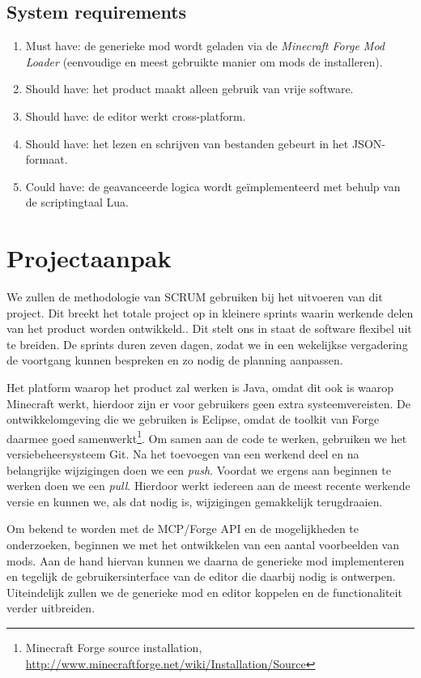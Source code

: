 \documentclass{article}
\begin{document}
	\subsection{System requirements}
	\begin{enumerate}
		\item Must have: de generieke mod wordt geladen via de \emph{Minecraft Forge Mod Loader} (eenvoudige en meest gebruikte manier om mods de installeren).
		
		\item Should have: het product maakt alleen gebruik van vrije software.
		\item Should have: de editor werkt cross-platform.
		\item Should have: het lezen en schrijven van bestanden gebeurt in het JSON-formaat.
		
		\item Could have: de geavanceerde logica wordt ge\"implementeerd met behulp van de scriptingtaal Lua.
	\end{enumerate}

\newpage

\section{Projectaanpak}
	We zullen de methodologie van SCRUM gebruiken bij het uitvoeren van dit project. Dit breekt het totale project op in kleinere sprints waarin werkende delen van het product worden ontwikkeld.. Dit stelt ons in staat de software flexibel uit te breiden. De sprints duren zeven dagen, zodat we in een wekelijkse vergadering de voortgang kunnen bespreken en zo nodig de planning aanpassen.
	
	Het platform waarop het product zal werken is Java, omdat dit ook is waarop Minecraft werkt, hierdoor zijn er voor gebruikers geen extra systeemvereisten. De ontwikkelomgeving die we gebruiken is Eclipse, omdat de toolkit van Forge daarmee goed samenwerkt\footnote{Minecraft Forge source installation, \url{http://www.minecraftforge.net/wiki/Installation/Source}}. Om samen aan de code te werken, gebruiken we het versiebeheersysteem Git. Na het toevoegen van een werkend deel en na belangrijke wijzigingen doen we een \emph{push}. Voordat we ergens aan beginnen te werken doen we een \emph{pull}. Hierdoor werkt iedereen aan de meest recente werkende versie en kunnen we, als dat nodig is, wijzigingen gemakkelijk terugdraaien.
	
	Om bekend te worden met de MCP/Forge API en de mogelijkheden te onderzoeken, beginnen we met het ontwikkelen van een aantal voorbeelden van mods. Aan de hand hiervan kunnen we daarna de generieke mod implementeren en tegelijk de gebruikersinterface van de editor die daarbij nodig is ontwerpen. Uiteindelijk zullen we de generieke mod en editor koppelen en de functionaliteit verder uitbreiden.
\end{document}
